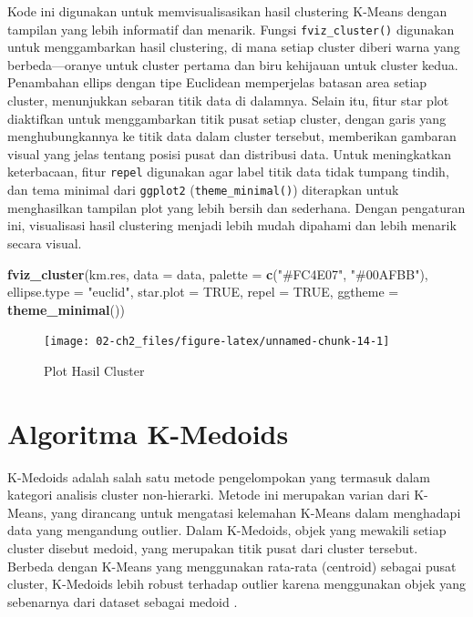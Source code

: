 \documentclass[
  oneside]{book}
\newenvironment{Shaded}{\begin{snugshade}}{\end{snugshade}}
\newcommand{\AttributeTok}[1]{\textcolor[rgb]{0.13,0.29,0.53}{#1}}
\newcommand{\ConstantTok}[1]{\textcolor[rgb]{0.56,0.35,0.01}{#1}}
\newcommand{\FunctionTok}[1]{\textcolor[rgb]{0.13,0.29,0.53}{\textbf{#1}}}
\newcommand{\NormalTok}[1]{#1}
\newcommand{\StringTok}[1]{\textcolor[rgb]{0.31,0.60,0.02}{#1}}
\begin{document}
Kode ini digunakan untuk memvisualisasikan hasil clustering K-Means dengan tampilan yang lebih informatif dan menarik. Fungsi \texttt{fviz\_cluster()} digunakan untuk menggambarkan hasil clustering, di mana setiap cluster diberi warna yang berbeda---oranye untuk cluster pertama dan biru kehijauan untuk cluster kedua. Penambahan ellips dengan tipe Euclidean memperjelas batasan area setiap cluster, menunjukkan sebaran titik data di dalamnya. Selain itu, fitur star plot diaktifkan untuk menggambarkan titik pusat setiap cluster, dengan garis yang menghubungkannya ke titik data dalam cluster tersebut, memberikan gambaran visual yang jelas tentang posisi pusat dan distribusi data. Untuk meningkatkan keterbacaan, fitur \texttt{repel} digunakan agar label titik data tidak tumpang tindih, dan tema minimal dari \texttt{ggplot2} (\texttt{theme\_minimal()}) diterapkan untuk menghasilkan tampilan plot yang lebih bersih dan sederhana. Dengan pengaturan ini, visualisasi hasil clustering menjadi lebih mudah dipahami dan lebih menarik secara visual.

\begin{Shaded}
\begin{Highlighting}[]
\FunctionTok{fviz\_cluster}\NormalTok{(km.res, }\AttributeTok{data =}\NormalTok{ data,}
             \AttributeTok{palette =} \FunctionTok{c}\NormalTok{(}\StringTok{"\#FC4E07"}\NormalTok{, }\StringTok{"\#00AFBB"}\NormalTok{),}
             \AttributeTok{ellipse.type =} \StringTok{"euclid"}\NormalTok{, }
             \AttributeTok{star.plot =} \ConstantTok{TRUE}\NormalTok{, }
             \AttributeTok{repel =} \ConstantTok{TRUE}\NormalTok{, }
             \AttributeTok{ggtheme =} \FunctionTok{theme\_minimal}\NormalTok{())}
\end{Highlighting}
\end{Shaded}

\begin{figure}[h]

{\centering \texttt{[image: 02-ch2\_files/figure-latex/unnamed-chunk-14-1]} 

}

\caption{Plot Hasil Cluster}\label{fig:unnamed-chunk-14}
\end{figure}

\chapter{Algoritma K-Medoids}\label{kmed}

K-Medoids adalah salah satu metode pengelompokan yang termasuk dalam kategori analisis cluster non-hierarki. Metode ini merupakan varian dari K-Means, yang dirancang untuk mengatasi kelemahan K-Means dalam menghadapi data yang mengandung outlier. Dalam K-Medoids, objek yang mewakili setiap cluster disebut medoid, yang merupakan titik pusat dari cluster tersebut. Berbeda dengan K-Means yang menggunakan rata-rata (centroid) sebagai pusat cluster, K-Medoids lebih robust terhadap outlier karena menggunakan objek yang sebenarnya dari dataset sebagai medoid \citep{jiawei2006data}.
\end{document}
